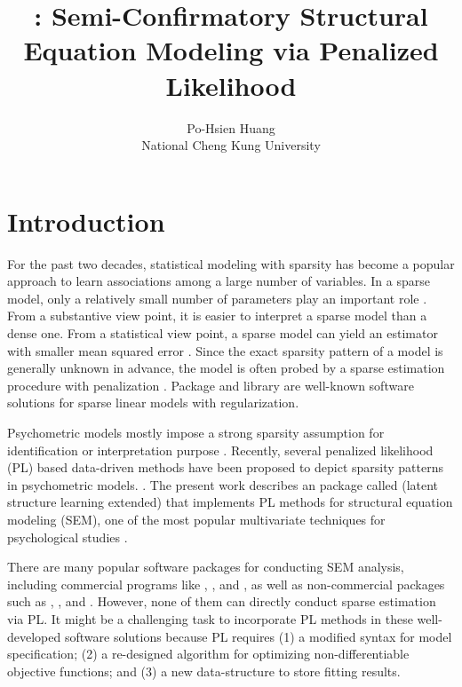 \documentclass[nojss]{jss}
\author{Po-Hsien Huang\\National Cheng Kung University}
\title{\pkg{lslx}: Semi-Confirmatory Structural Equation Modeling via Penalized Likelihood}
\begin{document}
\section{Introduction} \label{sec:intro} For the past two decades, statistical modeling with sparsity has become a popular approach to learn associations among a large number of variables. In a sparse model, only a relatively small number of parameters play an important role \citep{Hastie2015}. From a substantive view point, it is easier to interpret a sparse model than a dense one. From a statistical view point, a sparse model can yield an estimator with smaller mean squared error \citep[e.g.,][]{Knight2000, negahban2012}. Since the exact sparsity pattern of a model is generally unknown in advance, the model is often probed by a sparse estimation procedure with penalization \citep[or regularization; e.g.,][]{Tibshirani1996, FanJianqing2001, Zhang2010}. Package  \citep{Friedman2010} and library  \citep{REF08a} are well-known software solutions for sparse linear models with regularization.

Psychometric models mostly impose a strong sparsity assumption for identification or interpretation purpose \citep[e.g.,][]{Thurstone1947}. Recently, several penalized likelihood (PL) based data-driven methods have been proposed to depict sparsity patterns in psychometric models. \citep[e.g.,][]{Chen2015, Hirose2014, Hirose2014a, Huang, Jacobucci2016, Tutz2015}. The present work describes an  \citep{R2017} package called  (latent structure learning extended) that implements PL methods for structural equation modeling (SEM), one of the most popular multivariate techniques for psychological studies \citep{Hershberger2003}.

There are many popular software packages for conducting SEM analysis, including commercial programs like  \citep{Joreskog2015},  \citep{Bentler2006}, and  \citep{Muthen}, as well as non-commercial  packages such as  \citep{Fox2017},  \citep{Rosseel2012}, and  \citep{Neale2016}. However, none of them can directly conduct sparse estimation via PL. It might be a challenging task to incorporate PL methods in these well-developed software solutions because PL requires (1) a modified syntax for model specification; (2) a re-designed algorithm for optimizing non-differentiable objective functions; and (3) a new data-structure to store fitting results.
\end{document}
